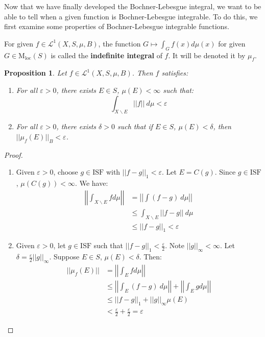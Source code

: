 \documentclass[a4paper,12pt]{report}
\newcommand{\ms}[1]{\mathscr{#1}}
\newcommand{\varep}{ \varepsilon }
\newcommand{\bs} {\backslash}
\newtheorem{prop}[theorem]{Proposition}
\newenvironment{definition}[1][Definition.]{\begin{trivlist}
\item[\hskip \labelsep {\bfseries #1}]}{\end{trivlist}}
\begin{document}
	 \noindent Now that we have finally developed the Bochner-Lebesgue integral, we want to be able to tell when a given function is Bochner-Lebesgue integrable. To do this, we first examine some properties of Bochner-Lebesgue integrable functions. 
	 
	\begin{definition}
		For given $f \in \ms{L}^1(X, S, \mu, B)$, the function $G \mapsto \int_G f(x) d\mu(x)$ for given $G \in \text{M}_{\text{loc}}(S)$ is called the \textbf{indefinite integral} of $f$. It will be denoted it by $\mu_f$. 
	\end{definition}	 
	 
	 \begin{prop}
	 Let $f \in \ms{L}^1(X, S, \mu, B)$. Then $f$ satisfies:
	 	\begin{enumerate}[label=(\alph*)]
	 		
			\item For all $\varep > 0$, there exists $E \in S$, $\mu(E) < \infty$ such that:
			\[ \int_{X \bs E} ||f|| ~ d\mu < \varep \]
		
			\item For all $\varep > 0$, there exists $\delta > 0$ such that if $E \in S$, $\mu(E) < \delta$, then $||\mu_f(E)||_B < \varep$. 		 			 		
	 	\end{enumerate}
	 \end{prop}
	 \begin{proof}
	 \begin{enumerate}[label=(\alph*)]
	 
	 \item Given $\varep > 0$, choose $g \in \text{ISF}$ with $||f - g||_1 < \varep$. Let $E = C(g)$. Since $g \in \text{ISF}$, $\mu(C(g)) < \infty$. We have:
	 \begin{align*}
	 \left|\left| \int_{X \bs E} f d\mu \right|\right| &= \left|\left| \int (f - g)  ~ d\mu \right| \right| \\
	 	&\leq \int_{X \bs E} ||f - g|| ~ d\mu \\
	 	&\leq ||f - g||_1 < \varep
	 \end{align*}

	 \item Given $\varep > 0$, let $g \in \text{ISF}$ such that $||f - g||_1 < \frac{\varep}{2}$. Note $||g||_\infty < \infty$. Let $\delta = \frac{\varep}{2}||g||_\infty$. Suppose $E \in S$, $\mu(E) < \delta$. Then:
	 \begin{align*}
	 ||\mu_f(E)|| &= \left|\left| \int_E f d\mu \right| \right| \\
	 &\leq \left|\left| \int_E (f - g) ~ d\mu \right| \right| + \left|\left| \int_E g d\mu \right|\right| \\
	 &\leq ||f - g||_1 + ||g||_\infty \mu(E) \\
	 &< \frac{\varep}{2} + \frac{\varep}{2} = \varep 
	 \end{align*}
	 
	 \end{enumerate}
	 \end{proof}
\end{document}
